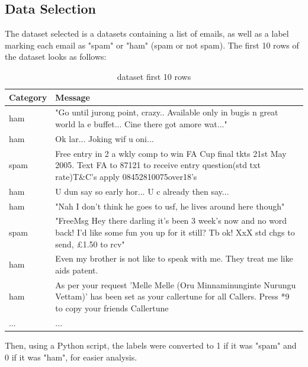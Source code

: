 \documentclass[12pt,a4paper,twoside]{article}
\begin{document}
\subsection{Data Selection}
\label{ssec:dataselection}

The dataset selected is a datasets containing a list of emails, as well as a label marking each
email as "spam" or "ham" (spam or not spam). The first 10 rows of the dataset looks as follows:

\begin{longtable}[!ht]{p{1.5cm}|p{11cm}}
    \caption{ dataset first 10 rows}\\
    \textbf{Category} & \textbf{Message} \\
    \hline
    ham      & "Go until jurong point, crazy.. Available only in bugis n great world la e buffet...
               Cine there got amore wat..." \\
    \hline
    ham      & Ok lar... Joking wif u oni... \\
    \hline
    spam     & Free entry in 2 a wkly comp to win FA Cup final tkts 21st May 2005. Text FA to 87121 to
               receive entry question(std txt rate)T\&C's apply 08452810075over18's \\
    \hline
    ham      & U dun say so early hor... U c already then say... \\
    \hline
    ham      & "Nah I don't think he goes to usf, he lives around here though" \\
    \hline
    spam     & "FreeMsg Hey there darling it's been 3 week's now and no word back! I'd like some fun you
                up for it still? Tb ok! XxX std chgs to send, \pounds 1.50 to rcv" \\
    \hline
    ham      & Even my brother is not like to speak with me. They treat me like aids patent. \\
    \hline
    ham      & As per your request 'Melle Melle (Oru Minnaminunginte Nurungu Vettam)' has
               been set as your callertune for all Callers. Press *9 to copy your friends Callertune \\
    \hline
    ...      & ... \\
\end{longtable}

Then, using a Python script, the labels were converted to 1 if it was "spam" and 0 if it was "ham",
for easier analysis.
\end{document}
